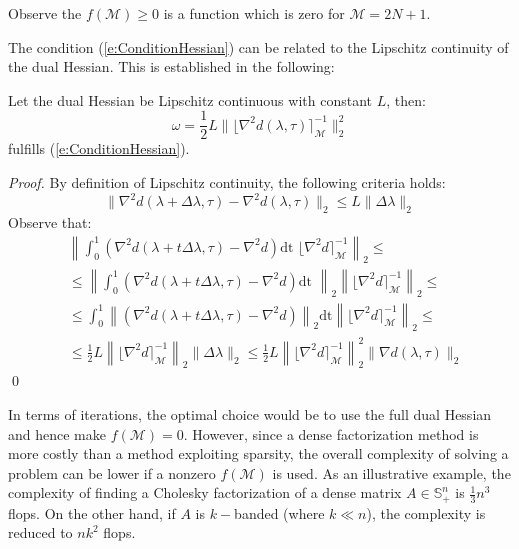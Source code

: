 \begin{remark}
Observe the $f(\mathcal{M}) \geq 0$ is a function which is zero for $\mathcal{M} = 2N + 1$.
\end{remark}
The condition (\ref{e:ConditionHessian}) can be related to the Lipschitz continuity of the dual Hessian. This is established in the following:
\begin{proposition} \label{p:LipschitzHessian}
Let the dual Hessian be Lipschitz continuous with constant $L$, then:
\begin{equation}
\omega = \frac{1}{2} L \| \lfloor \nabla^2 d(\lambda, \tau) \rceil_{\mathcal{M}}^{-1} \|_2^2
\end{equation}
fulfills (\ref{e:ConditionHessian}).
\end{proposition}
\begin{proof}
By definition of Lipschitz continuity, the following criteria holds:
\begin{equation}
\| \nabla^2 d(\lambda + \Delta \lambda, \tau) - \nabla^2 d(\lambda, \tau) \|_2 \leq L \| \Delta \lambda \|_2
\end{equation} 
Observe that:
\begin{equation}
\begin{aligned}
& \left\| \int_0^1 ( \nabla^2 d(\lambda + t \Delta \lambda, \tau) - \nabla^2 d ) \text{dt } \lfloor \nabla^2 d \rceil_{\mathcal{M}}^{-1} \right\|_2 \leq \\
& \leq \left\| \int_0^1 ( \nabla^2 d(\lambda + t \Delta \lambda, \tau) - \nabla^2 d ) \text{dt } \right\|_2 \left\| \lfloor \nabla^2 d \rceil_{\mathcal{M}}^{-1} \right\|_2 \leq \\
& \leq \int_0^1 \left\| ( \nabla^2 d(\lambda + t \Delta \lambda, \tau) - \nabla^2 d ) \right\|_2 \text{dt} \left\| \lfloor \nabla^2 d \rceil_{\mathcal{M}}^{-1} \right\|_2 \leq \\
& \leq \frac{1}{2} L \left\| \lfloor \nabla^2 d \rceil_{\mathcal{M}}^{-1} \right\|_2 \| \Delta \lambda \|_2 \leq \frac{1}{2} L \left\| \lfloor \nabla^2 d \rceil_{\mathcal{M}}^{-1} \right\|_2^2 \| \nabla d(\lambda, \tau) \|_2
\end{aligned}
\end{equation}
\qed
\end{proof}

In terms of iterations, the optimal choice would be to use the full dual Hessian and hence make $f(\mathcal{M}) = 0$. However, since a dense factorization method is more costly than a method exploiting sparsity, the overall complexity of solving a problem can be lower if a nonzero $f(\mathcal{M})$ is used. As an illustrative example, the complexity of finding a Cholesky factorization of a dense matrix $A \in \mathbb{S}_{+}^n$ is $\frac{1}{3}n^3$ flops. On the other hand, if $A$ is $k-$banded (where $k \ll n$), the complexity is reduced to $nk^2$ flops.

